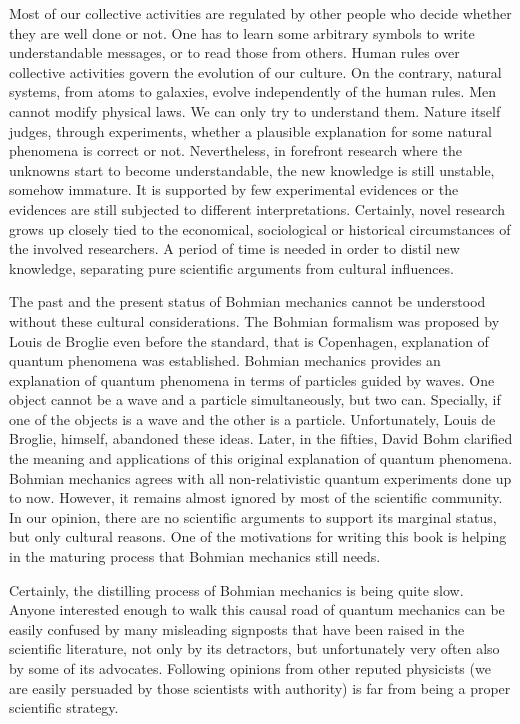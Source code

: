 \documentclass[nofootinbib, secnumarabic, amsmath, nobibnotes,11pt,aps,pra, floatfix]{revtex4-1}
\begin{document}
Most of our collective activities are regulated by other people who decide whether they are well done or not. One has to learn some arbitrary symbols to write understandable messages, or to read those from others. Human rules over collective activities govern the evolution of our culture. On the contrary, natural systems, from atoms to galaxies, evolve independently of the human rules. Men cannot modify physical laws. We can only try to understand them. Nature itself judges, through experiments, whether a plausible explanation for some natural phenomena is correct or not. Nevertheless, in forefront research where the unknowns start to become understandable, the new knowledge is still unstable, somehow immature. It is supported by few experimental evidences or the evidences are still subjected to different interpretations. Certainly, novel research grows up closely tied to the economical, sociological or historical circumstances of the involved researchers.  A period of time is needed in order to distil new knowledge, separating pure scientific arguments from cultural influences.

The past and the present status of Bohmian mechanics cannot be understood without these cultural considerations. The Bohmian formalism was proposed by Louis de Broglie even before the standard, that is Copenhagen, explanation of quantum phenomena was established.
Bohmian mechanics provides an explanation of quantum phenomena in terms of particles guided by waves.
One object cannot be a wave and a particle simultaneously, but two can. Specially, if one of the objects is a wave and the other is a particle. 
Unfortunately, Louis de Broglie, himself, abandoned these ideas. Later, in the fifties, David Bohm clarified the meaning and applications of this original explanation of quantum phenomena. Bohmian mechanics agrees with all non-relativistic quantum experiments done up to now. However, it remains almost ignored by most of the scientific community. In our opinion, there are no scientific arguments to support its marginal status, but only cultural reasons. One of the motivations for writing this book is helping in the maturing process that Bohmian mechanics still needs.

Certainly, the distilling process of Bohmian mechanics is being quite slow. Anyone interested enough to walk this causal road of quantum mechanics can be easily confused by many misleading signposts that have been raised in the scientific literature, not only by its detractors, but unfortunately very often also by some of its advocates. Following opinions from other reputed physicists (we are easily persuaded by those scientists with authority) is far from being a proper scientific strategy.
\end{document}
